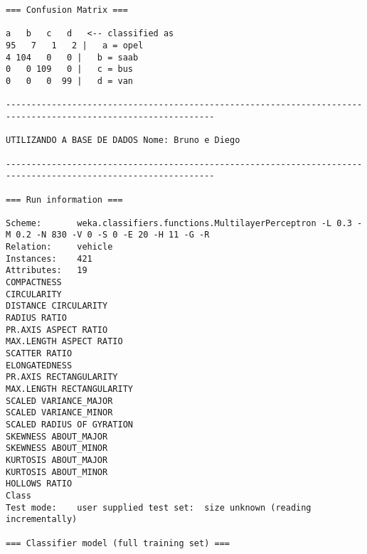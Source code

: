 \documentclass[
	article,			%
	11pt,				%
	oneside,			%
	a4paper,			%
	english,			%
	brazil,				%
	sumario=tradicional
	]{abntex2}
\begin{document}
\begin{lstlisting}
=== Confusion Matrix ===

a   b   c   d   <-- classified as
95   7   1   2 |   a = opel
4 104   0   0 |   b = saab
0   0 109   0 |   c = bus
0   0   0  99 |   d = van

---------------------------------------------------------------------------------------------------------------

UTILIZANDO A BASE DE DADOS Nome: Bruno e Diego

---------------------------------------------------------------------------------------------------------------

=== Run information ===

Scheme:       weka.classifiers.functions.MultilayerPerceptron -L 0.3 -M 0.2 -N 830 -V 0 -S 0 -E 20 -H 11 -G -R
Relation:     vehicle
Instances:    421
Attributes:   19
COMPACTNESS
CIRCULARITY
DISTANCE CIRCULARITY
RADIUS RATIO
PR.AXIS ASPECT RATIO
MAX.LENGTH ASPECT RATIO
SCATTER RATIO
ELONGATEDNESS
PR.AXIS RECTANGULARITY
MAX.LENGTH RECTANGULARITY
SCALED VARIANCE_MAJOR
SCALED VARIANCE_MINOR
SCALED RADIUS OF GYRATION
SKEWNESS ABOUT_MAJOR
SKEWNESS ABOUT_MINOR
KURTOSIS ABOUT_MAJOR
KURTOSIS ABOUT_MINOR
HOLLOWS RATIO
Class
Test mode:    user supplied test set:  size unknown (reading incrementally)

=== Classifier model (full training set) ===


\end{lstlisting}
\end{document}
